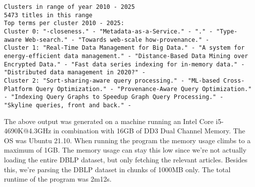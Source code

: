 \documentclass[11pt]{article}
\begin{document}
\begin{verbatim}
Clusters in range of year 2010 - 2025
5473 titles in this range
Top terms per cluster 2010 - 2025:
Cluster 0: "-closeness." - "Metadata-as-a-Service." - "." - "Type-aware Web-search." - "Towards web-scale how-provenance." - 
Cluster 1: "Real-Time Data Management for Big Data." - "A system for energy-efficient data management." - "Distance-Based Data Mining over Encrypted Data." - "Fast data series indexing for in-memory data." - "Distributed data management in 2020?" - 
Cluster 2: "Sort-sharing-aware query processing." - "ML-based Cross-Platform Query Optimization." - "Provenance-Aware Query Optimization." - "Indexing Query Graphs to Speedup Graph Query Processing." - "Skyline queries, front and back." - 

\end{verbatim}

The above output was generated on a machine running an Intel Core i5-4690K@4.3GHz in combination with 16GB of DD3 Dual Channel Memory. The OS was Ubuntu 21.10. When running the program the memory usage climbs to a maximum of 1GB. The memory usage can stay this low since we're not actually loading the entire DBLP dataset, but only fetching the relevant articles. Besides this, we're parsing the DBLP dataset in chunks of 1000MB only. The total runtime of the program was 2m12s.
\end{document}
